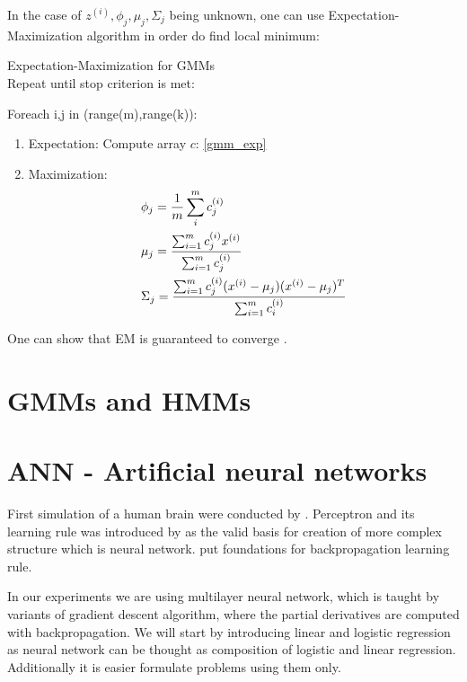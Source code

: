 In the case of $z^{(i)}, \phi_j, \mu_j, \Sigma_j$ being unknown, one can use Expectation-Maximization algorithm in order do find local minimum: 

\begin{algorithm} Expectation-Maximization for GMMs \\
Repeat until stop criterion is met:
\begin{indenva}
Foreach i,j in (range(m),range(k)):
\begin{indenvb}
	\begin{enumerate}
\item Expectation: 
	Compute array $c$: \eqref{gmm_exp}  
\item Maximization: 
	\begin{align}
		& \phi_j = \frac{1}{m}\operatorname*{\sum}_i^m c^{(i)}_j  \\
		& \mu_j = \frac{\operatorname*{\sum}^m_{i=1}c^{(i)}_jx^{(i)}}{\operatorname*{\sum}^m_{i=1}c^{(i)}_j} \\
		& \Sigma_j = \frac{\sum_{i=1}^m c^{(i)}_j(x^{(i)}-\mu_j)(x^{(i)}-\mu_j)^T}{\sum_{i=1}^m c^{(i)}_i}
	\end{align}
	\end{enumerate}
\end{indenvb}
\end{indenva}
\end{algorithm}
One can show that EM is guaranteed to converge \parencite{ng_cs229_2000}.


\section{GMMs and HMMs}



\section{ANN - Artificial neural networks}
First simulation of a human brain were conducted by \textcite{mcculloch}. Perceptron and its learning rule was introduced by \textcite{rosenblatt} as the valid basis for creation of more complex structure which is neural network. \textcite{hebb1} put foundations for backpropagation learning rule.

In our experiments we are using multilayer neural network, which is taught by variants of gradient descent algorithm, where the partial derivatives are computed with backpropagation. We will start by introducing linear and logistic regression as neural network can be thought as composition of logistic and linear regression. Additionally it is easier formulate problems using them only.

